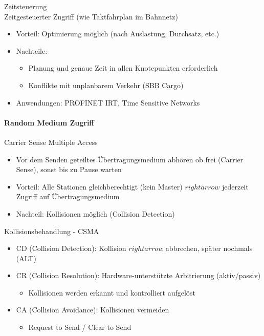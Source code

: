 \begin{definition}{Zeitsteuerung}\\
    Zeitgesteuerter Zugriff (wie Taktfahrplan im Bahnnetz)
    \begin{itemize}
        \item Vorteil: Optimierung möglich (nach Auslastung, Durchsatz, etc.)
        \item Nachteile:
        \begin{itemize}
            \item Planung und genaue Zeit in allen Knotepunkten erforderlich
            \item Konflikte mit unplanbarem Verkehr (SBB Cargo)
        \end{itemize}
        \item Anwendungen: PROFINET IRT, Time Sensitive Networks
    \end{itemize}
\end{definition}

\paragraph{Random Medium Zugriff}

\begin{definition}{Carrier Sense Multiple Access}
    \begin{itemize}
        \item Vor dem Senden geteiltes Übertragungsmedium abhören ob frei (Carrier Sense), sonst bis zu Pause warten
        \item Vorteil: Alle Stationen gleichberechtigt (kein Master) $rightarrow$ jederzeit Zugriff auf Übertragungsmedium
        \item Nachteil: Kollisionen möglich (Collision Detection)
    \end{itemize}
\end{definition}

\begin{concept}{Kollisionsbehandlung - CSMA}
    \begin{itemize}
        \item CD (Collision Detection): Kollision $rightarrow$ abbrechen, später nochmals (ALT)
        \item CR (Collision Resolution): Hardware-unterstützte Arbitrierung (aktiv/passiv)
        \begin{itemize}
            \item Kollisionen werden erkannt und kontrolliert aufgelöst
        \end{itemize}
        \item CA (Collision Avoidance): Kollisionen vermeiden
        \begin{itemize}
            \item Request to Send / Clear to Send
        \end{itemize}
    \end{itemize}
\end{concept}

